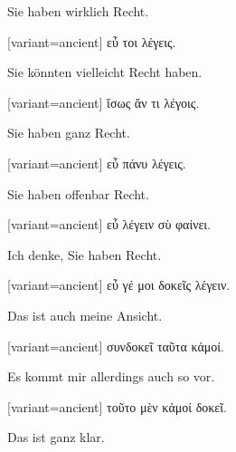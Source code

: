 Sie haben wirklich Recht. 

\switchcolumn

\begin{greek}[variant=ancient]%
εὖ τοι λέγεις.

\end{greek}%
\switchcolumn*

Sie könnten vielleicht Recht haben. 

\switchcolumn

\begin{greek}[variant=ancient]%
ἴσως ἄν τι λέγοις.

\end{greek}%
\switchcolumn*

Sie haben ganz Recht. 

\switchcolumn

\begin{greek}[variant=ancient]%
εὖ πάνυ λέγεις.

\end{greek}%
\switchcolumn*

Sie haben offenbar Recht. 

\switchcolumn

\begin{greek}[variant=ancient]%
εὖ λέγειν σὺ φαίνει.

\end{greek}%
\switchcolumn*

Ich denke, Sie haben Recht. 

\switchcolumn

\begin{greek}[variant=ancient]%
εὖ γέ μοι δοκεῖς λέγειν.

\end{greek}%
\switchcolumn*

Das ist auch meine Ansicht. 

\switchcolumn

\begin{greek}[variant=ancient]%
συνδοκεῖ ταῦτα κἀμοί.

\end{greek}%
\switchcolumn*

Es kommt mir allerdings auch so vor. 

\switchcolumn

\begin{greek}[variant=ancient]%
τοῦτο μὲν κἀμοί δοκεῖ.

\end{greek}%
\switchcolumn*

Das ist ganz klar. 


